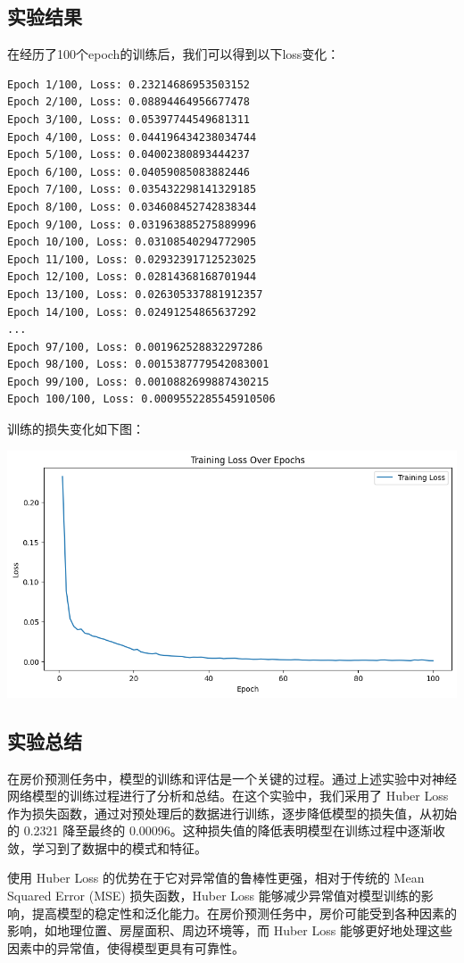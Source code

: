 \documentclass[a4paper,12pt]{article}
\begin{document}
\subsection{实验结果}
在经历了100个epoch的训练后，我们可以得到以下loss变化：
\begin{lstlisting}
Epoch 1/100, Loss: 0.23214686953503152
Epoch 2/100, Loss: 0.08894464956677478
Epoch 3/100, Loss: 0.05397744549681311
Epoch 4/100, Loss: 0.044196434238034744
Epoch 5/100, Loss: 0.04002380893444237
Epoch 6/100, Loss: 0.04059085083882446
Epoch 7/100, Loss: 0.035432298141329185
Epoch 8/100, Loss: 0.034608452742838344
Epoch 9/100, Loss: 0.031963885275889996
Epoch 10/100, Loss: 0.03108540294772905
Epoch 11/100, Loss: 0.02932391712523025
Epoch 12/100, Loss: 0.02814368168701944
Epoch 13/100, Loss: 0.026305337881912357
Epoch 14/100, Loss: 0.02491254865637292
...
Epoch 97/100, Loss: 0.001962528832297286
Epoch 98/100, Loss: 0.0015387779542083001
Epoch 99/100, Loss: 0.0010882699887430215
Epoch 100/100, Loss: 0.0009552285545910506
\end{lstlisting}
训练的损失变化如下图：

\centering %
\includegraphics[width=0.8\linewidth]{images/lab1_4_loss.png}
\justifying



\subsection{实验总结}
在房价预测任务中，模型的训练和评估是一个关键的过程。通过上述实验中对神经网络模型的训练过程进行了分析和总结。在这个实验中，我们采用了 Huber Loss 作为损失函数，通过对预处理后的数据进行训练，逐步降低模型的损失值，从初始的 0.2321 降至最终的 0.00096。这种损失值的降低表明模型在训练过程中逐渐收敛，学习到了数据中的模式和特征。

使用 Huber Loss 的优势在于它对异常值的鲁棒性更强，相对于传统的 Mean Squared Error (MSE) 损失函数，Huber Loss 能够减少异常值对模型训练的影响，提高模型的稳定性和泛化能力。在房价预测任务中，房价可能受到各种因素的影响，如地理位置、房屋面积、周边环境等，而 Huber Loss 能够更好地处理这些因素中的异常值，使得模型更具有可靠性。
\end{document}
